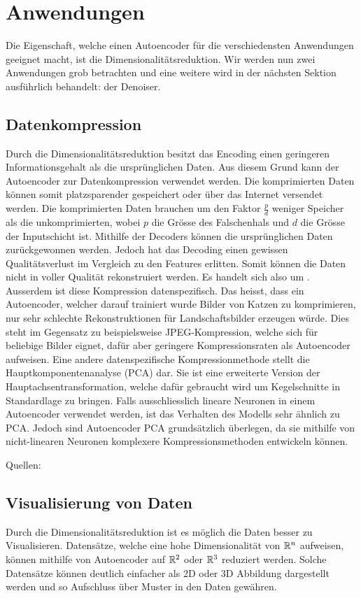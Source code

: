 \section{Anwendungen}
Die Eigenschaft, welche einen Autoencoder für die verschiedensten
Anwendungen geeignet macht, ist die Dimensionalitätsreduktion.
Wir werden nun zwei Anwendungen grob betrachten und eine weitere wird in der
nächsten Sektion ausführlich behandelt: der Denoiser.

\subsection{Datenkompression}
Durch die Dimensionalitätsreduktion besitzt das Encoding einen geringeren
Informationsgehalt als die ursprünglichen Daten. Aus diesem Grund kann der
Autoencoder zur Datenkompression verwendet werden. Die komprimierten Daten
können somit platzsparender gespeichert oder über das Internet versendet werden.
Die komprimierten Daten brauchen um den Faktor $\frac{p}{d}$ weniger Speicher als die
unkomprimierten, wobei $p$ die Grösse des Falschenhals und $d$ die Grösse
der Inputschicht ist.
Mithilfe der Decoders können die ursprünglichen Daten zurückgewonnen werden.
Jedoch hat das Decoding einen gewissen Qualitätsverlust im Vergleich zu den
Features erlitten. Somit können die Daten nicht in voller Qualität rekonstruiert
werden. Es handelt sich also um .
Ausserdem ist diese Kompression datenspezifisch. Das heisst, dass ein
Autoencoder, welcher darauf trainiert wurde Bilder von Katzen zu komprimieren,
nur sehr schlechte Rekonstruktionen für Landschaftsbilder erzeugen würde. Dies
steht im Gegensatz zu beispielsweise JPEG-Kompression, welche sich für beliebige
Bilder eignet, dafür aber geringere Kompressionsraten als Autoencoder aufweisen.
\para{}
Eine andere datenspezifische Kompressionmethode stellt die
Hauptkomponentenanalyse (PCA) dar. Sie ist eine erweiterte Version der
Hauptachsentransformation, welche dafür gebraucht wird um Kegelschnitte in
Standardlage zu bringen. Falls ausschliesslich lineare Neuronen in einem
Autoencoder verwendet werden, ist das Verhalten des Modells sehr ähnlich zu PCA.
Jedoch sind Autoencoder PCA grundsätzlich überlegen, da sie mithilfe von
nicht-linearen Neuronen komplexere Kompressionsmethoden entwickeln können.

\para{}
Quellen: \cite{paper:autoencoder_compression}


\subsection{Visualisierung von Daten}
Durch die Dimensionalitätsreduktion ist es möglich die Daten besser zu
Visualisieren. Datensätze, welche eine hohe Dimensionalität von $\mathbb{R}^n$
aufweisen, können mithilfe von Autoencoder auf $\mathbb{R}^2$ oder $\mathbb{R}^3$
reduziert werden. Solche Datensätze können deutlich einfacher als 2D oder 3D
Abbildung dargestellt werden und so Aufschluss über Muster in den Daten gewähren.

